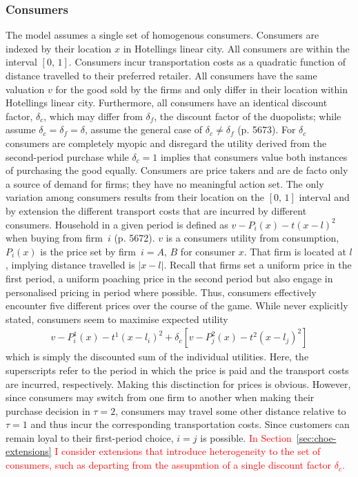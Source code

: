 \documentclass[a4paper, 11 pt, fleqn]{article}
\begin{document}
\subsubsection{Consumers}
The model assumes a single set of homogenous consumers. Consumers are indexed by their location $x$ in Hotellings linear city.
All consumers are within the interval $[0,\,1]$. Consumers incur transportation costs as a quadratic function of distance travelled
to their preferred retailer. All consumers have the same valuation $v$ for the good sold by the firms and only differ in their location
within Hotellings linear city. Furthermore, all consumers have an identical discount factor, $\delta_c$, which may differ from $\delta_f$,
the discount factor of the duopolists; while \citet{Fudenberg.2000} assume $\delta_c = \delta_f = \delta$, \citet{Choe.2018} assume the
general case of $\delta_c \neq \delta_f$ (p. 5673). For $\delta_c$ consumers are completely myopic and disregard the utility derived
from the second-period purchase while $\delta_c = 1$ implies that consumers value both instances of purchasing the good equally.
Consumers are price takers and are de facto only a source of demand for firms; they have no meaningful action set. The only variation
among consumers results from their location on the $[0,\,1]$ interval and by extension the different transport costs that are incurred
by different consumers. Household in a given period is defined as $v - P_i(x)-t(x-l)^2$ when buying from firm~$i$ (p. 5672). $v$ is a
consumers utility from consumption, $P_i(x)$ is the price set by firm~$i = A,\,B$ for consumer $x$. That firm is located at $l$, implying distance
travelled is $|x-l|$. Recall that firms set a uniform price in the first period, a uniform poaching price in the second period but also engage
in personalised pricing in period where possible. Thus, consumers effectively encounter five different prices over the course of the game. 
While never explicitly stated, consumers seem to maximise expected utility 
\begin{align} \label{eq:consumer-expected-utility}
	v - P^1_i(x)-t^1(x-l_i)^2 + \delta_c [v - P^2_j(x)-t^2(x-l_j)^2]
\end{align}
which is simply the discounted sum of the individual utilities. Here, the superscripts refer to the period in which the price is paid and the
transport costs are incurred, respectively. Making this disctinction for prices is obvious. However, since consumers may switch from one firm
to another when making their purchase decision in $\tau = 2$, consumers may travel some other distance relative to $\tau = 1$ and thus incur
the corresponding transportation costs. Since customers can remain loyal to their first-period choice, $i = j$ is possible.
\textcolor{red}{In Section~\ref{sec:choe-extensions} I consider extensions that introduce heterogeneity to the set of consumers, such as departing
from the assupmtion of a single discount factor $\delta_c$.}
%
\end{document}

